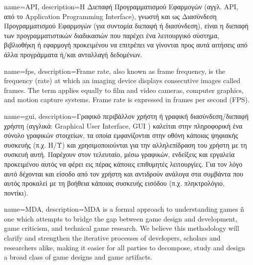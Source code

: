 {
	name=API,
	description={H Διεπαφή Προγραμματισμού Εφαρμογών (αγγλ. API, από το Application Programming Interface), γνωστή και ως Διασύνδεση Προγραμματισμού Εφαρμογών (για συντομία διεπαφή ή διασύνδεση), είναι η διεπαφή των προγραμματιστικών διαδικασιών που παρέχει ένα λειτουργικό σύστημα, βιβλιοθήκη ή εφαρμογή προκειμένου να επιτρέπει να γίνονται προς αυτά αιτήσεις από άλλα προγράμματα ή/και ανταλλαγή δεδομένων.}
}

{
	name={fps},
	description={Frame rate, also known as frame frequency, is the frequency (rate) at which an imaging device displays consecutive images called frames. The term applies equally to film and video cameras, computer graphics, and motion capture systems. Frame rate is expressed in frames per second (FPS).}
}

{
	name={gui},
	description={Γραφικό περιβάλλον χρήστη ή γραφική διασύνδεση/διεπαφή χρήστη (αγγλικά: Graphical User Interface, GUI ) καλείται στην πληροφορική ένα σύνολο γραφικών στοιχείων, τα οποία εμφανίζονται στην οθόνη κάποιας ψηφιακής συσκευής (π.χ. Η/Υ) και χρησιμοποιούνται για την αλληλεπίδραση του χρήστη με τη συσκευή αυτή. Παρέχουν στον τελευταίο, μέσω γραφικών, ενδείξεις και εργαλεία προκειμένου αυτός να φέρει εις πέρας κάποιες επιθυμητές λειτουργίες. Για τον λόγο αυτό δέχονται και είσοδο από τον χρήστη και αντιδρούν ανάλογα στα συμβάντα που αυτός προκαλεί με τη βοήθεια κάποιας συσκευής εισόδου (π.χ. πληκτρολόγιο, ποντίκι).}		
}

{
	name={MDA},
	description={MDA is a formal approach to understanding games ñ one
		which attempts to bridge the gap between game design and
		development, game criticism, and technical game research.
		We believe this methodology will clarify and strengthen the
		iterative processes of developers, scholars and researchers
		alike, making it easier for all parties to decompose, study
		and design a broad class of game designs and game
		artifacts. }	
}